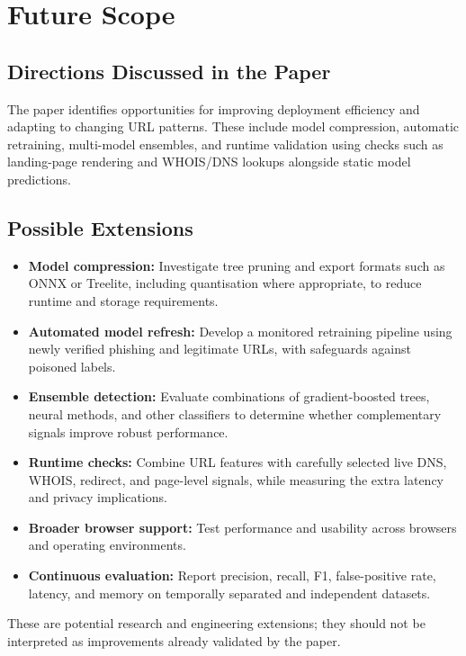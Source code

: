 \chapter{Future Scope}
\setcounter{equation}{0}
\section{Directions Discussed in the Paper}
The paper identifies opportunities for improving deployment efficiency and adapting to changing URL patterns. These include model compression, automatic retraining, multi-model ensembles, and runtime validation using checks such as landing-page rendering and WHOIS/DNS lookups alongside static model predictions.\cite{bib1}

\section{Possible Extensions}
\begin{itemize}
\item \textbf{Model compression:} Investigate tree pruning and export formats such as ONNX or Treelite, including quantisation where appropriate, to reduce runtime and storage requirements.
\item \textbf{Automated model refresh:} Develop a monitored retraining pipeline using newly verified phishing and legitimate URLs, with safeguards against poisoned labels.
\item \textbf{Ensemble detection:} Evaluate combinations of gradient-boosted trees, neural methods, and other classifiers to determine whether complementary signals improve robust performance.
\item \textbf{Runtime checks:} Combine URL features with carefully selected live DNS, WHOIS, redirect, and page-level signals, while measuring the extra latency and privacy implications.
\item \textbf{Broader browser support:} Test performance and usability across browsers and operating environments.
\item \textbf{Continuous evaluation:} Report precision, recall, F1, false-positive rate, latency, and memory on temporally separated and independent datasets.
\end{itemize}

These are potential research and engineering extensions; they should not be interpreted as improvements already validated by the paper.
